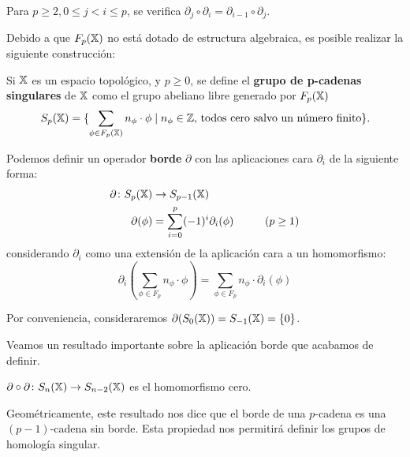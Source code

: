 \begin{corollary}
  Para $p \geq 2, 0 \leq j < i \leq p$, se verifica $\partial_j \circ \partial_i = \partial_{i-1} \circ \partial_j$.
\end{corollary}

Debido a que $F_{p}({\mathbb X})$ no está dotado de estructura algebraica, es posible realizar la siguiente construcción:

\begin{definition}
  Si ${\mathbb X}$ es un espacio topológico, y $p \geq 0$, se define el \textbf{grupo de p-cadenas singulares} de ${\mathbb X}$
  como el grupo abeliano libre generado por $F_{p}({\mathbb X})$
  \[ S_p({\mathbb X}) = \{\sum_{\phi \in F_{p}({\mathbb X})} n_\phi \cdot \phi  \mid n_\phi \in \mathbb{Z} \text{, todos cero salvo un número finito} \}.\]

  Podemos definir un operador \textbf{borde} $\partial$ con las aplicaciones cara $\partial_i$ de la siguiente forma:
  \begin{align*}
    \partial \colon S_p({\mathbb X}) &\to S_{p-1}({\mathbb X})\\
    \partial(\phi) &= \sum_{i = 0}^p (-1)^i \partial_i(\phi)  \hspace{1cm} (p \geq 1)
  \end{align*}
  considerando $\partial_i$ como una extensión de la aplicación cara a un homomorfismo:
  \[\partial_i(\sum_{\phi \in F_p} n_\phi \cdot \phi) = \sum_{\phi \in F_p} n_\phi \cdot \partial_i(\phi) \]
\end{definition}

Por conveniencia, consideraremos $\partial(S_0({\mathbb X})) = S_{-1}({\mathbb X}) = \{0\}$.


Veamos un resultado importante sobre la aplicación borde que acabamos de definir.

\begin{proposition}
  $\partial \circ \partial \colon S_{n}({\mathbb X}) \to S_{n-2}({\mathbb X})$ es el homomorfismo cero.
\end{proposition}

Geométricamente, este resultado nos dice que el borde de una $p$-cadena es una $(p-1)$-cadena sin
borde. Esta propiedad nos permitirá definir los grupos de homología singular.

